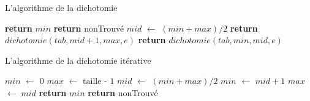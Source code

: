 \documentclass[10pt,xcolor=dvipsnames]{beamer}
\newcommand*\Let[2]{\State #1 $\gets$ #2}
\begin{document}
\begin{frame}{L'algorithme de la dichotomie}
    
\begin{tcolorbox}
  \begin{algorithmic}[1]
        
                \State \textbf{return} $min$
        \Else
            \State \textbf{return} nonTrouvé
                        \EndIf
        \EndIf
    \Let{$mid$}{$( min + max ) / 2$}
        \State \textbf{return} $dichotomie(tab, mid+1, max, e)$
    \Else
        \State \textbf{return} $dichotomie(tab, min, mid, e)$
    \EndIf
    \EndFunction
  \end{algorithmic}
\end{tcolorbox}


\end{frame}

\begin{frame}{L'algorithme de la dichotomie itérative}
    
\begin{tcolorbox}
  \begin{algorithmic}[1]
    \Let{$min$}{$0$}
    \Let{$max$}{$\text{taille - 1}$}
        \Let{$mid$}{$( min + max ) / 2 $}
            \Let{$min$}{$mid+1$}
        \Else
            \Let{$max$}{$mid$}
        \EndIf
    \EndWhile 
        \State \textbf{return} $min$
    \Else
        \State \textbf{return} nonTrouvé
    \EndIf
    \EndFunction
  \end{algorithmic}
\end{tcolorbox}

\vspace{-0.2cm}


\end{frame}
\end{document}
